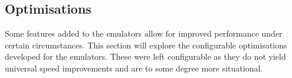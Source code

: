 \subsection{Optimisations}

Some features added to the emulators allow for improved performance under certain circumstances. This section will explore the configurable optimisations developed for the emulators. These were left configurable as they do not yield universal speed improvements and are to some degree more situational.


